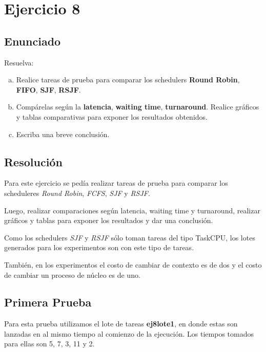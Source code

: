 \section{Ejercicio 8}

\subsection{Enunciado}
Resuelva:

\begin{enumerate}[a)]
\item Realice tareas de prueba para comparar los schedulers \textbf{Round Robin}, \textbf{FIFO}, \textbf{SJF}, \textbf{RSJF}.

\item Compárelas según la \textbf{latencia}, \textbf{waiting time}, \textbf{turnaround}.
\newline
Realice gráficos y tablas comparativas para exponer los resultados obtenidos.

\item Escriba una breve conclusión.

\end{enumerate}


\subsection{Resolución}

Para este ejercicio se pedía realizar tareas de prueba para comparar los scheduleres \emph{Round Robin}, \emph{FCFS}, \emph{SJF} y \emph{RSJF}.

Luego, realizar comparaciones según latencia, waiting time y turnaround, realizar gráficos y tablas para exponer los resultados y dar una conclusión.

Como los schedulers \emph{SJF} y \emph{RSJF} sólo toman tareas del tipo TaskCPU, los lotes generados para los experimentos son con este tipo de tareas.

También, en los experimentos el costo de cambiar de contexto es de dos y el costo de cambiar un proceso de núcleo es de uno.

\subsection{Primera Prueba}

Para esta prueba utilizamos el lote de tareas \textbf{ej8lote1}, en donde estas son lanzadas en al mismo tiempo al comienzo de la ejecución. Los tiempos tomados para ellas son 5, 7, 3, 11 y 2.

